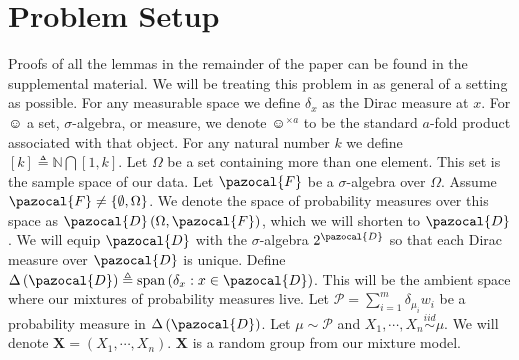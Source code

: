 \documentclass{article} %
\def\sF{\pazocal{F}}
\def\sD{\pazocal{D}}
\def\sP{\mathscr{P}}
\def\bX{\mathbf{X}}
\def\dd{\Delta\left( \sD \right)}
\def\span{\operatorname{span}}
\def\simiid{\overset{iid}{\sim}}
\theoremstyle{definition}
\begin{document}
\section{Problem Setup} Proofs of all the lemmas in the remainder of the paper can be found in the supplemental material.
We will be treating this problem in as general of a setting as possible. For any measurable space we define $\delta_x$ as the Dirac measure at $x$. For $\smiley$ a set, $\sigma$-algebra, or measure, we denote $\smiley^{\times a}$ to be the standard $a$-fold product associated with that object. For any natural number $k$ we define $\left[ k \right] \triangleq \mathbb{N} \bigcap \left[ 1,k \right]$.
Let $\Omega$ be a set containing more than one element. This set is the sample space of our data. Let $\sF$ be a $\sigma$-algebra over $\Omega$. Assume $\sF \neq \left\{ \emptyset, \Omega \right\}$. We denote the space of probability measures over this space as $\sD\left( \Omega,\sF \right)$, which we will shorten to $\sD$. We will equip $\sD$ with the $\sigma$-algebra $2^\sD$ so that each Dirac measure over $\sD$ is unique. Define $\dd \triangleq \span\left( \delta_x: x \in \sD \right)$. This will be the ambient space where our mixtures of probability measures live. Let $\sP = \sum_{i=1}^m \delta_{\mu_i} w_i $ be a probability measure in $\dd$. Let $\mu\sim \sP$ and $X_1 ,\cdots, X_n \simiid \mu$. We will denote $\bX = \left( X_1,\cdots,X_n \right)$. $\bX$ is a random group from our mixture model.
\end{document}
